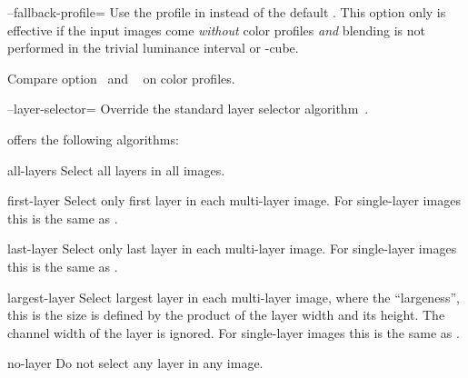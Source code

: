 \begin{codelist}
  \label{opt:fallback-profile}%
\item[--fallback-profile=\metavar{PROFILE-FILENAME}]\itemend
  Use the  profile in  instead of the default
  . This
  option only is effective if the input images come \emph{without} color profiles \emph{and}
  blending is not performed in the trivial luminance interval
  or -cube.

  Compare option~ and
  \chapterName~ on color profiles.


  \label{opt:layer-selector}%
\item[--layer-selector=\metavar{ALGORITHM}]\itemend
  Override the standard layer selector algorithm~.

  \App{} offers the following algorithms:

  \begin{codelist}
  \item[all-layers]\itemend
    Select all layers in all images.

  \item[first-layer]\itemend
    Select only first layer in each multi-layer image.  For single-layer images this is the same
    as .

  \item[last-layer]\itemend
    Select only last layer in each multi-layer image.  For single-layer images this is the same
    as .

  \item[largest-layer]\itemend
    Select largest layer in each multi-layer image, where the ``largeness'', this is the size is
    defined by the product of the layer width and its height.  The channel width of the layer is
    ignored.  For single-layer images this is the same as .

  \item[no-layer]\itemend
    Do not select any layer in any image.


\end{codelist}
\end{codelist}
